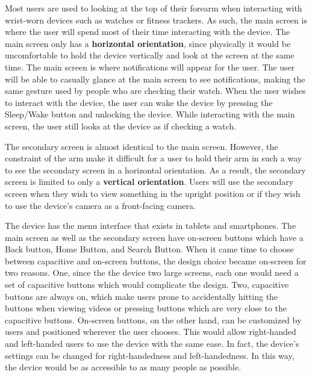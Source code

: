 \documentclass[11pt]{article}
\begin{document}
Most users are used to looking at the top of their forearm when interacting with wrist-worn devices such as watches or fitness trackers. As such, the main screen is where the user will spend most of their time interacting with the device. The main screen only has a \textbf{horizontal orientation}, since physically it would be uncomfortable to hold the device vertically and look at the screen at the same time. The main screen is where notifications will appear for the user. The user will be able to casually glance at the main screen to see notifications, making the same gesture used by people who are checking their watch. When the user wishes to interact with the device, the user can wake the device by pressing the Sleep/Wake button and unlocking the device. While interacting with the main screen, the user still looks at the device as if checking a watch. 

The secondary screen is almost identical to the main screen. However, the constraint of the arm make it difficult for a user to hold their arm in such a way to see the secondary screen in a horizontal orientation. As a result, the secondary screen is limited to only a \textbf{vertical orientation}. Users will use the secondary screen when they wish to view something in the upright position or if they wish to use the device's camera as a front-facing camera. 

The device has the menu interface that exists in tablets and smartphones. The main screen as well as the secondary screen have on-screen buttons which have a Back button, Home Button, and Search Button. When it came time to choose between capacitive and on-screen buttons, the design choice became on-screen for two reasons. One, since the the device two large screens, each one would need a set of capacitive buttons which would complicate the design. Two, capacitive buttons are always on, which make users prone to accidentally hitting the buttons when viewing videos or pressing buttons which are very close to the capacitive buttons. On-screen buttons, on the other hand, can be customized by users and positioned wherever the user chooses. This would allow right-handed and left-handed users to use the device with the same ease. In fact, the device's settings can be changed for right-handedness and left-handedness. In this way, the device would be as accessible to as many people as possible.
\end{document}
